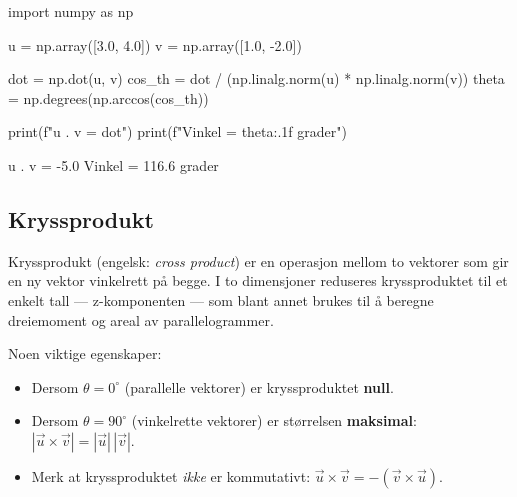 \begin{pythonkode}
import numpy as np

u = np.array([3.0,  4.0])
v = np.array([1.0, -2.0])

dot    = np.dot(u, v)
cos_th = dot / (np.linalg.norm(u) * np.linalg.norm(v))
theta  = np.degrees(np.arccos(cos_th))

print(f"u . v  = {dot}")
print(f"Vinkel = {theta:.1f} grader")
\end{pythonkode}
\begin{pythonoutput}
u . v  = -5.0
Vinkel = 116.6 grader
\end{pythonoutput}


\subsection{Kryssprodukt}

Kryssprodukt (engelsk: \textit{cross product}) er en operasjon mellom to vektorer som gir en ny vektor vinkelrett på begge. I to dimensjoner reduseres kryssproduktet til et enkelt tall — z-komponenten — som blant annet brukes til å beregne dreiemoment og areal av parallelogrammer.


Noen viktige egenskaper:
\begin{itemize}
    \item Dersom $\theta = 0^\circ$ (parallelle vektorer) er kryssproduktet \textbf{null}.
    \item Dersom $\theta = 90^\circ$ (vinkelrette vektorer) er størrelsen \textbf{maksimal}: $|\vec{u}\times\vec{v}|=|\vec{u}|\,|\vec{v}|$.
    \item Merk at kryssproduktet \emph{ikke} er kommutativt: $\vec{u}\times\vec{v} = -(\vec{v}\times\vec{u})$.
\end{itemize}

